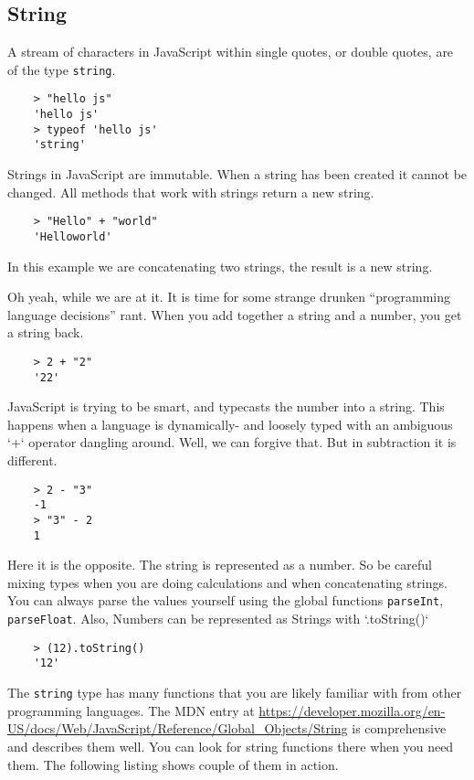 \subsection{String}
A stream of characters in JavaScript within single quotes, or double quotes, are of the type \texttt{string}.

\begin{lstlisting}
    > "hello js"
    'hello js'
    > typeof 'hello js'
    'string'
\end{lstlisting}

Strings in JavaScript are immutable. When a string has been created it cannot be changed. All methods that work with strings return a new string.

\begin{lstlisting}
    > "Hello" + "world"
    'Helloworld'
\end{lstlisting}

In this example we are concatenating two strings, the result is a new string.

Oh yeah, while we are at it. It is time for some strange drunken ``programming language decisions'' rant. When you add together a string and a number, you get a string back.

\begin{lstlisting}
    > 2 + "2"
    '22'
\end{lstlisting}

JavaScript is trying to be smart, and typecasts the number into a string. This happens when a language is dynamically- and loosely typed with an ambiguous `+` operator dangling around. Well, we can forgive that. But in subtraction it is different.

\begin{lstlisting}
    > 2 - "3"
    -1
    > "3" - 2
    1
\end{lstlisting}

Here it is the opposite. The string is represented as a number. So be careful mixing types when you are doing calculations and when concatenating strings. You can always parse the values yourself using the global functions \texttt{parseInt}, \texttt{parseFloat}. Also, Numbers can be represented as Strings with `.toString()`

\begin{lstlisting}
    > (12).toString()
    '12'
\end{lstlisting}

The \texttt{string} type has many functions that you are likely familiar with from other programming languages. The MDN entry at \url{https://developer.mozilla.org/en-US/docs/Web/JavaScript/Reference/Global_Objects/String} is comprehensive and describes them well. You can look for string functions there when you need them. The following listing shows couple of them in action.

